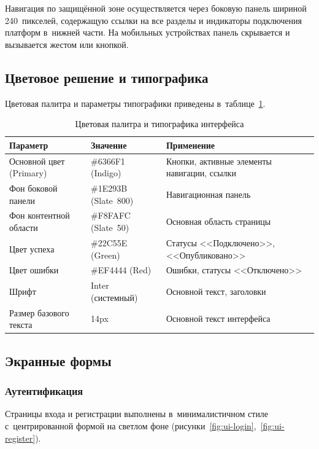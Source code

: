Навигация по защищённой зоне осуществляется через боковую панель шириной 240~пикселей, содержащую ссылки на все разделы и индикаторы подключения платформ в~нижней части. На мобильных устройствах панель скрывается и вызывается жестом или кнопкой.

\subsection{Цветовое решение и типографика}
\label{subsec:colors}

Цветовая палитра и параметры типографики приведены в~таблице~\ref{tab:design-tokens}.

\begin{table}[H]
  \caption{Цветовая палитра и типографика интерфейса}
  \label{tab:design-tokens}
  \small
  \begin{tabularx}{\textwidth}{|p{4cm}|p{3.5cm}|X|}
    \hline
    \textbf{Параметр} & \textbf{Значение} & \textbf{Применение} \\
    \hline
    Основной цвет (Primary) & \#6366F1 (Indigo) & Кнопки, активные элементы навигации, ссылки \\
    \hline
    Фон боковой панели & \#1E293B (Slate~800) & Навигационная панель \\
    \hline
    Фон контентной области & \#F8FAFC (Slate~50) & Основная область страницы \\
    \hline
    Цвет успеха & \#22C55E (Green) & Статусы <<Подключено>>, <<Опубликовано>> \\
    \hline
    Цвет ошибки & \#EF4444 (Red) & Ошибки, статусы <<Отключено>> \\
    \hline
    Шрифт & Inter (системный) & Основной текст, заголовки \\
    \hline
    Размер базового текста & 14px & Основной текст интерфейса \\
    \hline
  \end{tabularx}
\end{table}

\subsection{Экранные формы}
\label{subsec:screens-detail}

\subsubsection{Аутентификация}

Страницы входа и регистрации выполнены в~минималистичном стиле с~центрированной формой на светлом фоне (рисунки~\ref{fig:ui-login},~\ref{fig:ui-register}).

